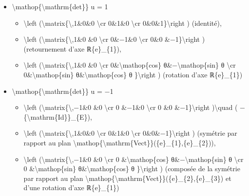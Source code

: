\documentclass[]{article}
\begin{document}
\begin{itemize}
\itemsep1pt\parskip0pt
\item
  \textbackslash{}mathop\{\textbackslash{}mathrm\{det\}\} u = 1

  \begin{itemize}
  \itemsep1pt\parskip0pt
  \item
    \textbackslash{}left
    (\textbackslash{}matrix\{\textbackslash{},1\&0\&0 \textbackslash{}cr
    0\&1\&0 \textbackslash{}cr 0\&0\&1\}\textbackslash{}right )
    (identité),
  \item
    \textbackslash{}left (\textbackslash{}matrix\{\textbackslash{},1\&0
    \&0 \textbackslash{}cr 0\&−1\&0 \textbackslash{}cr 0\&0
    \&−1\}\textbackslash{}right ) (retournement d'axe ℝ\{e\}\_\{1\}),
  \item
    \textbackslash{}left (\textbackslash{}matrix\{\textbackslash{},1\&0
    \&0 \textbackslash{}cr 0\&\textbackslash{}mathop\{cos\}
    θ\&−\textbackslash{}mathop\{sin\} θ \textbackslash{}cr
    0\&\textbackslash{}mathop\{sin\} θ\&\textbackslash{}mathop\{cos\} θ
    \}\textbackslash{}right ) (rotation d'axe ℝ\{e\}\_\{1\})
  \end{itemize}
\item
  \textbackslash{}mathop\{\textbackslash{}mathrm\{det\}\} u = −1

  \begin{itemize}
  \itemsep1pt\parskip0pt
  \item
    \textbackslash{}left (\textbackslash{}matrix\{\textbackslash{},−1\&0
    \&0 \textbackslash{}cr 0 \&−1\&0 \textbackslash{}cr 0 \&0
    \&−1\}\textbackslash{}right )\textbackslash{}quad (
    −\{\textbackslash{}mathrm\{Id\}\}\_\{E\}),
  \item
    \textbackslash{}left
    (\textbackslash{}matrix\{\textbackslash{},1\&0\&0 \textbackslash{}cr
    0\&1\&0 \textbackslash{}cr 0\&0\&−1\}\textbackslash{}right )
    (symétrie par rapport au plan
    \textbackslash{}mathop\{\textbackslash{}mathrm\{Vect\}\}(\{e\}\_\{1\},\{e\}\_\{2\})),
  \item
    \textbackslash{}left (\textbackslash{}matrix\{\textbackslash{},−1\&0
    \&0 \textbackslash{}cr 0 \&\textbackslash{}mathop\{cos\}
    θ\&−\textbackslash{}mathop\{sin\} θ \textbackslash{}cr 0
    \&\textbackslash{}mathop\{sin\} θ\&\textbackslash{}mathop\{cos\} θ
    \}\textbackslash{}right ) (composée de la symétrie par rapport au
    plan
    \textbackslash{}mathop\{\textbackslash{}mathrm\{Vect\}\}(\{e\}\_\{2\},\{e\}\_\{3\})
    et d'une rotation d'axe ℝ\{e\}\_\{1\})
  \end{itemize}
\end{itemize}
\end{document}
